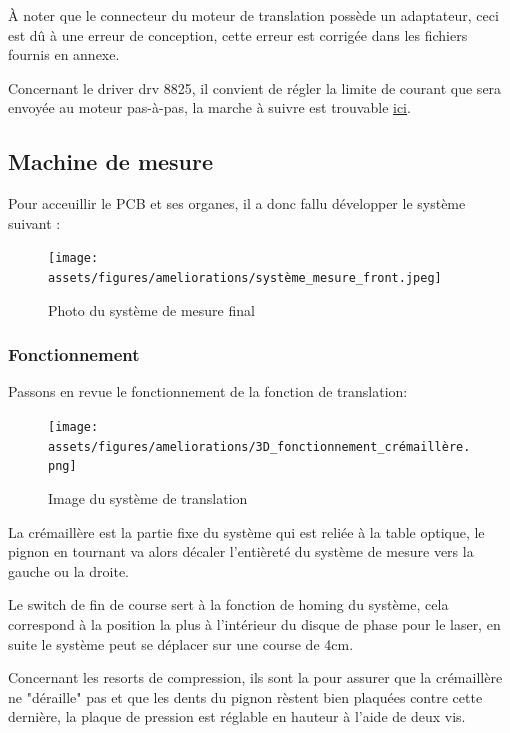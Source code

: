 À noter que le connecteur du moteur de translation possède un adaptateur, ceci est dû à une erreur de conception, cette erreur est corrigée
dans les fichiers fournis en annexe.

Concernant le driver drv 8825, il convient de régler la limite de courant que sera envoyée au moteur pas-à-pas, la marche à suivre est trouvable \href{https://www.pololu.com/product/2133}{ici}.\footnotemark



\subsection{Machine de mesure}
Pour acceuillir le PCB et ses organes, il a donc fallu développer le système suivant :
\begin{figure}[H]
    \centering
    \texttt{[image: assets/figures/ameliorations/système\_mesure\_front.jpeg]}
    \caption{Photo du système de mesure final}
\end{figure}

\newpage

\subsubsection{Fonctionnement}
Passons en revue le fonctionnement de la fonction de translation:
\begin{figure}[H]
    \centering
    \texttt{[image: assets/figures/ameliorations/3D\_fonctionnement\_crémaillère.png]}
    \caption{Image du système de translation}
\end{figure}
La crémaillère est la partie fixe du système qui est reliée à la table optique, le pignon en tournant va alors décaler l'entièreté du système de mesure
vers la gauche ou la droite.

Le switch de fin de course sert à la fonction de homing du système, cela correspond à la position la plus à l'intérieur du disque
de phase pour le laser, en suite le système peut se déplacer sur une course de 4cm.

Concernant les resorts de compression, ils sont la pour assurer que la crémaillère ne "déraille" pas et que les dents du pignon rèstent bien plaquées
contre cette dernière, la plaque de pression est réglable en hauteur à l'aide de deux vis.

\newpage
